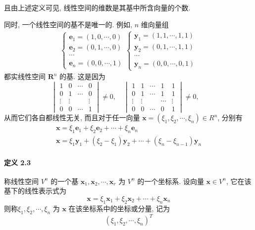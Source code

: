 \par 且由上述定义可见, 线性空间的维数是其基中所含向量的个数.

\par 同时, 一个线性空间的基不是唯一的. 例如, $n$ 维向量组
\begin{gather}
    \begin{cases}
        \bm{e}_1 = (1, 0, \cdots, 0) \\
        \bm{e}_2 = (0, 1, \cdots, 0) \\
        \cdots                       \\
        \bm{e}_n = (0, 0, \cdots, 1)
    \end{cases}
    \begin{cases}
        \bm{y}_1 = (1, 1, \cdots, 1, 1) \\
        \bm{y}_2 = (0, 1, \cdots, 1, 1) \\
        \cdots                          \\
        \bm{y}_n = (0, 0, \cdots, 0, 1)
    \end{cases}
    \tag{2.1.1} \label{2.1.1}
\end{gather}
都实线性空间 $\bm{R}^n$ 的基. 这是因为
$$
    \begin{vmatrix}
        1      & 0      & \cdots & 0      \\
        0      & 1      & \cdots & 0      \\
        \vdots & \vdots &        & \vdots \\
        0      & 0      & \cdots & 1
    \end{vmatrix} \neq 0, \quad
    \begin{vmatrix}
        1      & 1      & \cdots & 1      & 1      \\
        0      & 1      & \cdots & 1      & 1      \\
        \vdots & \vdots &        & \cdots & \vdots \\
        0      & 0      & \cdots & 0      & 1
    \end{vmatrix} \neq 0, \quad
$$
从而它们各自都线性无关, 而且对于任一向量 $\bm{x} = (\xi_1, \xi_2, \cdots, \xi_n) \in R^n$, 分别有
\begin{gather*}
    \bm{x} = \xi_1\bm{e}_1 + \xi_2\bm{e}_2 + \cdots + \xi_n\bm{e}_n \\
    \bm{x} = \xi_1\bm{y}_1 + (\xi_2 - \xi_1)\bm{y}_2 + \cdots + (\xi_n - \xi_{n - 1})\bm{y}_n
\end{gather*}

\paragraph*{定义 2.3} 称线性空间 $V^n$ 的一个基 $\bm{x}_1,\bm{x}_2,\cdots,\bm{x}_r$ 为 $V^n$ 的一个坐标系. 设向量 $\bm{x} \in V^n$, 它在该基下的线性表示式为
$$
    \bm{x} = \xi_1 \bm{x}_1 + \xi_2 \bm{x}_2 + \cdots + \xi_n \bm{x}_n
$$
则称$\xi_1, \xi_2, \cdots, \xi_n$ 为 $\bm{x}$ 在该坐标系中的坐标或分量, 记为
$$
    (\xi_1, \xi_2, \cdots, \xi_n)^T
$$

